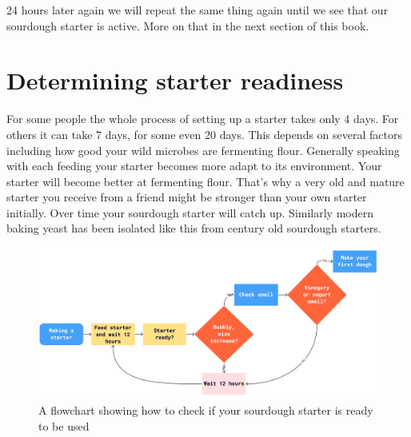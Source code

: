 24 hours later again we will repeat the same thing again until
we see that our sourdough starter is active. More on that in the
next section of this book.

\section{Determining starter readiness}

For some people the whole process of setting up a starter takes
only 4 days. For others it can take 7 days, for some even 20 days.
This depends on several factors including how good your wild microbes
are fermenting flour. Generally speaking with each feeding
your starter becomes more adapt to its environment. Your
starter will become better at fermenting flour. That's why
a very old and mature starter you receive from a friend might
be stronger than your own starter initially. Over time
your sourdough starter will catch up. Similarly modern baking
yeast has been isolated like this from century old sourdough
starters.

\begin{figure}[!htb]
  \includegraphics[width=\textwidth]{sourdough-starter-readiness.jpg}
  \caption{A flowchart showing how to check if your sourdough starter is ready
  to be used}
  \label{fig:sourdough-starter-readiness}
\end{figure}

